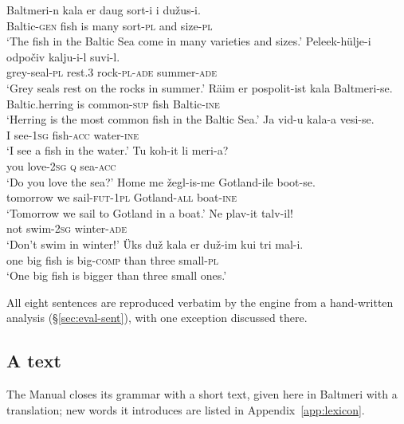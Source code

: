 \begin{exe}
\ex \gll Baltmeri-n kala er daug sort-i i dužus-i. \\
Baltic-\textsc{gen} fish is many sort-\textsc{pl} and size-\textsc{pl} \\
\glt `The fish in the Baltic Sea come in many varieties and sizes.'
\ex \gll Peleek-hülje-i odpočiv kalju-i-l suvi-l. \\
grey-seal-\textsc{pl} rest.3 rock-\textsc{pl}-\textsc{ade} summer-\textsc{ade} \\
\glt `Grey seals rest on the rocks in summer.'
\ex \gll Räim er pospolit-ist kala Baltmeri-se. \\
Baltic.herring is common-\textsc{sup} fish Baltic-\textsc{ine} \\
\glt `Herring is the most common fish in the Baltic Sea.'
\ex \gll Ja vid-u kala-a vesi-se. \\
I see-1\textsc{sg} fish-\textsc{acc} water-\textsc{ine} \\
\glt `I see a fish in the water.'
\ex \gll Tu koh-it li meri-a? \\
you love-2\textsc{sg} \textsc{q} sea-\textsc{acc} \\
\glt `Do you love the sea?'
\ex \gll Home me žegl-is-me Gotland-ile boot-se. \\
tomorrow we sail-\textsc{fut}-1\textsc{pl} Gotland-\textsc{all} boat-\textsc{ine} \\
\glt `Tomorrow we sail to Gotland in a boat.'
\ex \gll Ne plav-it talv-il! \\
not swim-2\textsc{sg} winter-\textsc{ade} \\
\glt `Don't swim in winter!'
\ex \gll Üks duž kala er duž-im kui tri mal-i. \\
one big fish is big-\textsc{comp} than three small-\textsc{pl} \\
\glt `One big fish is bigger than three small ones.'
\end{exe}

All eight sentences are reproduced verbatim by the engine from a hand-written analysis (\S\ref{sec:eval-sent}), with one exception discussed there.

\subsection{A text}
The Manual closes its grammar with a short text, given here in Baltmeri with a translation; new words it introduces are listed in Appendix~\ref{app:lexicon}.

